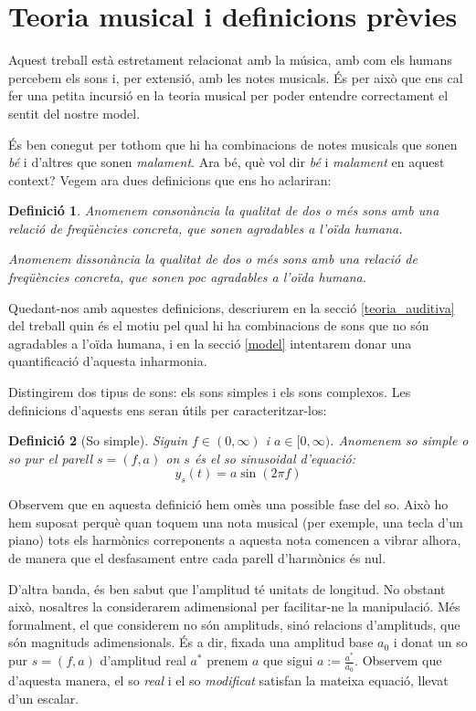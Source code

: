 \documentclass{article}
\theoremstyle{math}
\newtheorem{definition}{Definició}[section]
\theoremstyle{TheoremNum}
\newcommand{\0}{\ensuremath{\vb{0}}}
\begin{document}
\section{Teoria musical i definicions prèvies}\label{teoria_musical}
Aquest treball està estretament relacionat amb la música, amb com els humans percebem els sons i, per extensió, amb les notes musicals. És per això que ens cal fer una petita incursió en la teoria musical per poder entendre correctament el sentit del nostre model.\par
És ben conegut per tothom que hi ha combinacions de notes musicals que sonen \textit{bé} i d'altres que sonen \textit{malament}. Ara bé, què vol dir \textit{bé} i \textit{malament} en aquest context? Vegem ara dues definicions que ens ho aclariran:
\begin{definition}
Anomenem \textit{consonància} la qualitat de dos o més sons amb una relació de freqüències concreta, que sonen agradables a l'oïda humana.\par
\noindent Anomenem \textit{dissonància} la qualitat de dos o més sons amb una relació de freqüències concreta, que sonen poc agradables a l'oïda humana.
\end{definition}
Quedant-nos amb aquestes definicions, descriurem en la secció \ref{teoria_auditiva} del treball quin és el motiu pel qual hi ha combinacions de sons que no són agradables a l'oïda humana, i en la secció \ref{model} intentarem donar una quantificació d'aquesta inharmonia.\par
Distingirem dos tipus de sons: els sons simples i els sons complexos. Les definicions d'aquests ens seran útils per caracteritzar-los:
\begin{definition}[So simple]
Siguin $f\in(0,\infty)$ i $a\in[0,\infty)$. Anomenem \textit{so simple} o \textit{so pur} el parell $s=(f, a)$ on $s$ és el so sinusoidal d'equació: $$y_s(t)=a\sin(2\pi f)$$
\end{definition}
\noindent Observem que en aquesta definició hem omès una possible fase del so. Això ho hem suposat perquè quan toquem una nota musical (per exemple, una tecla d'un piano) tots els harmònics correponents a aquesta nota comencen a vibrar alhora, de manera que el desfasament entre cada parell d'harmònics és nul.\par D'altra banda, és ben sabut que l'amplitud té unitats de longitud. No obstant això, nosaltres la considerarem adimensional per facilitar-ne la manipulació. Més formalment, el que considerem no són amplituds, sinó relacions d'amplituds, que són magnituds adimensionals. És a dir, fixada una amplitud base $a_0$ i donat un so pur $s=(f,a)$ d'amplitud real $a^*$ prenem $a$ que sigui $a:=\frac{a^*}{a_0}$. Observem que d'aquesta manera, el so \textit{real} i el so \textit{modificat} satisfan la mateixa equació, llevat d'un escalar.
\end{document}
